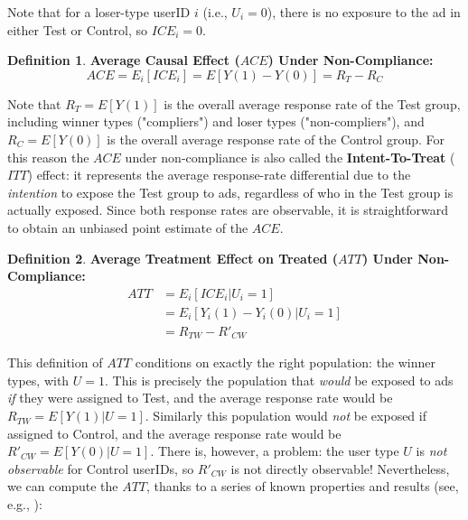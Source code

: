\documentclass[11pt,a4paper]{article}
\theoremstyle{definition}
\newtheorem{definition}{Definition}[section]
\theoremstyle{remark}
\theoremstyle{definition}
\theoremstyle{definition}
\theoremstyle{definition}
\theoremstyle{definition}
\theoremstyle{definition}
\theoremstyle{definition}
\begin{document}
Note that for a loser-type userID $i$ (i.e., $U_i = 0$), there is no exposure to the ad in either Test or Control, so $ICE_i = 0$.

\begin{definition}\label{def-ace-noncomp}
	\textbf{Average Causal Effect ($ACE$) Under Non-Compliance:}
\begin{equation}
ACE = E_i[ICE_i] = E[ Y(1) - Y(0) ] = R_T - R_C \label{eq-ace-noncomp}	
\end{equation}
\end{definition}

Note that $R_T = E[ Y(1)]$ is the overall average response rate of the Test group, including winner types ("compliers") and loser types ("non-compliers"), and $R_C = E[Y(0)]$ is the overall average response rate of the Control group. For this reason the $ACE$ under non-compliance is also called the \textbf{Intent-To-Treat} ($ITT$) effect: it represents the average response-rate differential due to the \textit{intention} to expose the Test group to ads, regardless of who in the Test group is actually exposed. Since both response rates are observable, it is straightforward to obtain an unbiased point estimate of the $ACE$.

\begin{definition}\label{def-att-noncomp}
	\textbf{Average Treatment Effect on Treated ($ATT$) Under Non-Compliance:}
\begin{align}
ATT & =  E_i[ ICE_i | U_i = 1]   \nonumber \\
    & =  E_i [Y_i(1) - Y_i(0) | U_i = 1] 	\nonumber \\
	& =  R_{TW} - R'_{CW}  \label{eq-att-noncomp}	
\end{align}

\end{definition}

This definition of $ATT$ conditions on exactly the right population: the winner types, with $U=1$. This is precisely the population that \textit{would} be exposed to ads \textit{if} they were assigned to Test, and the average response rate would be $R_{TW} = E[Y(1)| U=1]$. Similarly this population would \textit{not} be exposed if assigned to Control, and the average response rate would be $R'_{CW} = E[Y(0)|U=1]$. There is, however, a problem: the user type $U$ is \textit{not observable} for Control userIDs, so $R'_{CW}$ is not directly observable! Nevertheless, we can compute the $ATT$, thanks to a series of known properties and results (see, e.g., \cite{Little_Causal_2000}):
\end{document}
